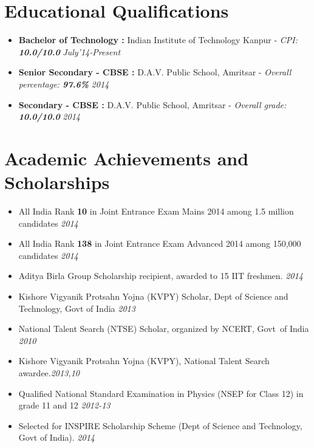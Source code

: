 \documentclass[11pt,a4paper]{moderncv}
\newcommand{\education}[5]{
\item[] \textbf{\large{#1 :}} #2 - \emph{#3: \textbf{#4}} \hfill\textit{#5}
}
\newcommand{\onepage}[1]{
\ifdefined\onep
#1
\fi
}
\newcommand{\twopage}[1]{
\ifdefined\twop
#1
\fi
}
\newcommand{\secspace}{
\onepage{\vspace{-0.27cm}}
\twopage{\vspace{-0.1cm}}
}
\newcommand{\secbelow}{
\onepage{\vspace{-0.07cm}}
}
\begin{document}
\maketitle
\onepage{\vspace{-1.4cm}}
\twopage{\vspace{-1cm}}
\section*{Educational Qualifications}
\secbelow
\begin{itemize}
  \twopage{\setlength\itemsep{0.2cm}}
  \education{Bachelor of Technology}{Indian Institute of Technology Kanpur}{CPI}{10.0/10.0}{July'14-Present}
  \education{Senior Secondary - CBSE}{D.A.V. Public School, Amritsar}{Overall percentage}{97.6\%}{2014}
  \education{Secondary - CBSE}{D.A.V. Public School, Amritsar}{Overall grade}{10.0/10.0}{2014}
\end{itemize}

\secspace
\section*{Academic Achievements and Scholarships}
\secbelow
\begin{itemize}
  \twopage{\setlength\itemsep{0.5em}}
  \item All India Rank \textbf{10} in Joint Entrance Exam Mains 2014 among 1.5 million candidates              \hfill \textit{2014}
  \item All India Rank \textbf{138} in Joint Entrance Exam Advanced 2014 among 150,000 candidates            	\hfill \textit{2014}
  \item Aditya Birla Group Scholarship recipient, awarded to 15 IIT freshmen. \hfill \textit{2014}

  \twopage{
  \item Kishore Vigyanik Protsahn Yojna (KVPY) Scholar, Dept of Science and Technology, Govt of India
    \hfill \textit{2013}
  \item National Talent Search (NTSE) Scholar, organized by NCERT, Govt\ of India
    \hfill \textit{2010}}

  \onepage{\item Kishore Vigyanik Protsahn Yojna (KVPY), National Talent Search awardee.\hfill\textit{2013,10}}

  \twopage{
    \item Qualified National Standard Examination in Physics (NSEP for Class 12) in grade 11 and 12 \hfill \textit{2012-13}
    \item Selected for INSPIRE Scholarship Scheme (Dept of Science and Technology, Govt of India). \hfill \textit{2014}}

\end{itemize}
\end{document}
